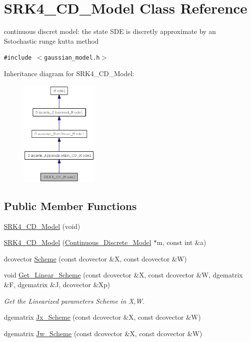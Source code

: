 \hypertarget{class_s_r_k4___c_d___model}{
\section{SRK4\_\-CD\_\-Model Class Reference}
\label{class_s_r_k4___c_d___model}
}
continuous discret model: the state SDE is discretly approximate by an Sstochastic runge kutta method  


{\tt \#include $<$gaussian\_\-model.h$>$}

Inheritance diagram for SRK4\_\-CD\_\-Model:\nopagebreak
\begin{figure}[H]
\begin{center}
\leavevmode
\includegraphics[width=111pt]{class_s_r_k4___c_d___model__inherit__graph}
\end{center}
\end{figure}
\subsection*{Public Member Functions}
\begin{CompactItemize}
\item 
\hyperlink{class_s_r_k4___c_d___model_52708f290c0dfb41c8de289c2e716cb3}{SRK4\_\-CD\_\-Model} (void)
\item 
\hyperlink{class_s_r_k4___c_d___model_e1ae17aa1fe147b7da45493f2d4db40c}{SRK4\_\-CD\_\-Model} (\hyperlink{class_continuous___discrete___model}{Continuous\_\-Discrete\_\-Model} $\ast$m, const int \&a)
\item 
dcovector \hyperlink{class_s_r_k4___c_d___model_553c1dc82fe1e497ff73a919e6bd98e6}{Scheme} (const dcovector \&X, const dcovector \&W)
\item 
void \hyperlink{class_s_r_k4___c_d___model_c348e8a59d0880ac366190004f4df36b}{Get\_\-Linear\_\-Scheme} (const dcovector \&X, const dcovector \&W, dgematrix \&F, dgematrix \&J, dcovector \&Xp)
\begin{CompactList}\small\item\em Get the Linearized parameters Scheme in X,W. \item\end{CompactList}\item 
dgematrix \hyperlink{class_s_r_k4___c_d___model_2e0543a20a7ba52958606bda265413bd}{Jx\_\-Scheme} (const dcovector \&X, const dcovector \&W)
\item 
dgematrix \hyperlink{class_s_r_k4___c_d___model_37045148c197b6143df008855179dfa3}{Jw\_\-Scheme} (const dcovector \&X, const dcovector \&W)
\end{CompactItemize}


